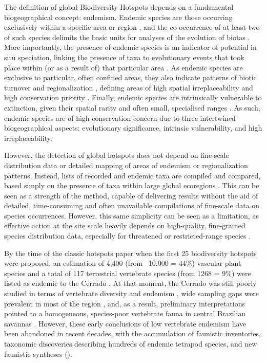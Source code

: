 \documentclass[12pt,openright,oneside,a4paper,english]{abntex2}
\begin{document}
The definition of global Biodiversity Hotspots depends on a fundamental biogeographical concept: endemism. Endemic species are those occurring exclusively within a specific area or region \citep{Nelson1981}, and the co-occurrence of at least two of such species delimits the basic units for analyses of the evolution of biotas \citep{Nelson1981}. More importantly, the presence of endemic species is an indicator of potential in situ speciation, linking the presence of taxa to evolutionary events that took place within (or as a result of) that particular area \citep{HaroldMooi1994}. As endemic species are exclusive to particular, often confined areas, they also indicate patterns of biotic turnover and regionalization \citep{HaroldMooi1994, Hausdorf2002}, defining areas of high spatial irreplaceability and high conservation priority \citep{Lamoreux2006, Brooks2006}. Finally, endemic species are intrinsically vulnerable to extinction, given their spatial rarity and often small, specialised ranges \citep{Gaston1998}. As such, endemic species are of high conservation concern due to three intertwined biogeographical aspects: evolutionary significance, intrinsic vulnerability, and high irreplaceability.

However, the detection of global hotspots does not depend on fine-scale distribution data or detailed mapping of areas of endemism or regionalization patterns. Instead, lists of recorded and endemic taxa are compiled and compared, based simply on the presence of taxa within large global ecoregions \citep{Myers1988, Myers1990, Mittermeier1998, Myers2000}. This can be seen as a strength of the method, capable of delivering results without the aid of detailed, time-consuming and often unavailable compilations of fine-scale data on species occurrences. However, this same simplicity can be seen as a limitation, as effective action at the site scale heavily depends on high-quality, fine-grained species distribution data, especially for threatened or restricted-range species \citep{Eken2004, Brooks2006}.

By the time of the classic hotspots paper \citep{Myers2000} when the first 25 biodiversity hotspots were proposed, an estimation of 4,400 (from ~10,000 = 44\%) vascular plant species and a total of 117 terrestrial vertebrate species (from 1268 = 9\%) were listed as endemic to the Cerrado \citep{Myers2000}. At that moment, the Cerrado was still poorly studied in terms of vertebrate diversity and endemism \citep{Nogueira2010, Colli2020}, wide sampling gaps were prevalent in most of the region \citep{Cavalcanti2002, Colli2002, Macedo2002, MarinhoFilho2002}, and, as a result, preliminary interpretations pointed to a homogeneous, species-poor vertebrate fauna in central Brazilian savannas \citep{Sick1965, Vanzolini1963}. However, these early conclusions of low vertebrate endemism have been abandoned in recent decades, with the accumulation of faunistic inventories, taxonomic discoveries describing hundreds of endemic tetrapod species, and new faunistic syntheses (\citealp[][present study]{Nogueira2009, Nogueira2010, Valdujo2012, Azevedo2016, GutierrezMarinho2017, Nogueira2019, Carmignotto2022}).
\end{document}
